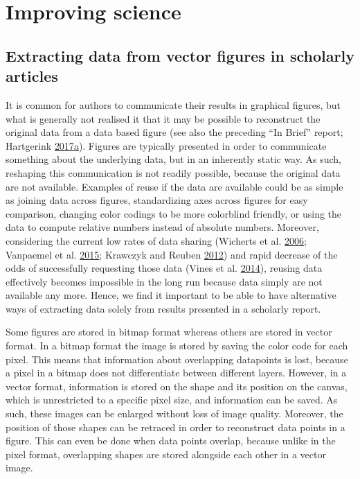 \documentclass[a5paper]{book}
\begin{document}
\part{Improving science}\label{part-improving-science}

\chapter{Extracting data from vector figures in scholarly
articles}\label{extracting-data-from-vector-figures-in-scholarly-articles}

It is common for authors to communicate their results in graphical
figures, but what is generally not realised it that it may be possible
to reconstruct the original data from a data based figure (see also the
preceding ``In Brief'' report; Hartgerink
\protect\hyperlink{ref-Hartgerink-dlib2017}{2017}\protect\hyperlink{ref-Hartgerink-dlib2017}{a}).
Figures are typically presented in order to communicate something about
the underlying data, but in an inherently static way. As such, reshaping
this communication is not readily possible, because the original data
are not available. Examples of reuse if the data are available could be
as simple as joining data across figures, standardizing axes across
figures for easy comparison, changing color codings to be more
colorblind friendly, or using the data to compute relative numbers
instead of absolute numbers. Moreover, considering the current low rates
of data sharing (Wicherts et al.
\protect\hyperlink{ref-doi:10.1037ux2f0003-066x.61.7.726}{2006};
Vanpaemel et al.
\protect\hyperlink{ref-doi:10.1525ux2fcollabra.13}{2015}; Krawczyk and
Reuben
\protect\hyperlink{ref-doi:10.1080ux2f08989621.2012.678688}{2012}) and
rapid decrease of the odds of successfully requesting those data (Vines
et al. \protect\hyperlink{ref-doi:10.1016ux2fj.cub.2013.11.014}{2014}),
reusing data effectively becomes impossible in the long run because data
simply are not available any more. Hence, we find it important to be
able to have alternative ways of extracting data solely from results
presented in a scholarly report.

Some figures are stored in bitmap format whereas others are stored in
vector format. In a bitmap format the image is stored by saving the
color code for each pixel. This means that information about overlapping
datapoints is lost, because a pixel in a bitmap does not differentiate
between different layers. However, in a vector format, information is
stored on the shape and its position on the canvas, which is
unrestricted to a specific pixel size, and information can be saved. As
such, these images can be enlarged without loss of image quality.
Moreover, the position of those shapes can be retraced in order to
reconstruct data points in a figure. This can even be done when data
points overlap, because unlike in the pixel format, overlapping shapes
are stored alongside each other in a vector image.
\end{document}
